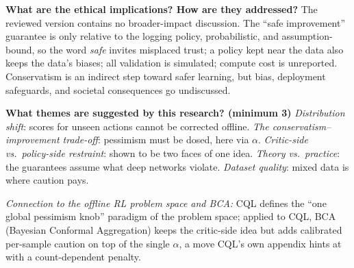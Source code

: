 \documentclass[11pt]{article}
\newcommand{\q}[2]{\item \textbf{#1} #2}
\newcommand{\tiein}[1]{\par\smallskip\noindent\emph{Connection to the offline RL problem space and BCA:} #1\par\medskip}
\begin{document}
\begin{qna}
\q{What are the ethical implications? How are they addressed?}
The reviewed version contains no broader-impact discussion. The ``safe improvement'' guarantee is only relative to the logging policy, probabilistic, and assumption-bound, so the word \emph{safe} invites misplaced trust; a policy kept near the data also keeps the data's biases; all validation is simulated; compute cost is unreported. Conservatism is an indirect step toward safer learning, but bias, deployment safeguards, and societal consequences go undiscussed.

\q{What themes are suggested by this research? (minimum 3)}
\emph{Distribution shift}: scores for unseen actions cannot be corrected offline. \emph{The conservatism--improvement trade-off}: pessimism must be dosed, here via $\alpha$. \emph{Critic-side vs.\ policy-side restraint}: shown to be two faces of one idea. \emph{Theory vs.\ practice}: the guarantees assume what deep networks violate. \emph{Dataset quality}: mixed data is where caution pays.

\end{qna}
\tiein{CQL defines the ``one global pessimism knob'' paradigm of the problem space; applied to CQL, BCA (Bayesian Conformal Aggregation) keeps the critic-side idea but adds calibrated per-sample caution on top of the single $\alpha$, a move CQL's own appendix hints at with a count-dependent penalty.}
\end{document}
